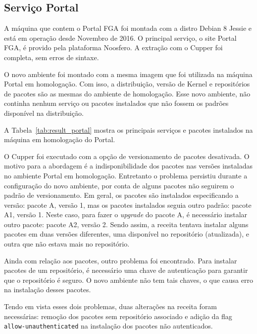 \subsection{Serviço Portal}

A máquina que contem o Portal FGA foi montada com a distro Debian 8 Jessie
e está em operação desde Novembro de 2016. O principal serviço, o site Portal FGA,
é provido pela plataforma Noosfero. A extração com o Cupper foi completa,
sem erros de sintaxe.

O novo ambiente foi montado com a mesma imagem que foi utilizada na máquina
Portal em homologação. Com isso, a distribuição, versão de Kernel e repositórios
de pacotes são as mesmas do ambiente de homologação. Esse novo ambiente, não
continha nenhum serviço ou pacotes instalados que não fossem os padrões
disponível na distribuição.

A Tabela~\ref{tab:result_portal} mostra os principais serviços e pacotes instalados
na máquina em homologação do Portal.

O Cupper foi executado com a opção de versionamento de pacotes desativada. O motivo para
a abordagem é a indisponibilidade dos pacotes nas versões instaladas no ambiente
Portal em homologação. Entretanto o problema persistiu durante a configuração
do novo ambiente, por conta de alguns pacotes não seguirem o padrão de versionamento.
Em geral, os pacotes são instalados especificando a versão: pacote A, versão 1, mas os
pacotes instalados seguia outro padrão: pacote A1, versão 1. Neste caso,
para fazer o \textit{upgrade} do pacote A, é necessário instalar outro pacote: pacote A2,
versão 2. Sendo assim, a receita tentava instalar alguns pacotes em duas versões
diferentes, uma disponível no repositório (atualizada), e outra que não estava mais
no repositório.

Ainda com relação aos pacotes, outro problema foi encontrado. Para instalar pacotes
de um repositório, é necessário uma chave de autenticação para garantir que o repositório
é seguro. O novo ambiente não tem tais chaves, o que causa erro na instalação desses
pacotes.

Tendo em vista esses dois problemas, duas alterações na receita foram necessárias:
remoção dos pacotes sem repositório associado e adição da flag \texttt{allow-unauthenticated}
na instalação dos pacotes não autenticados.


